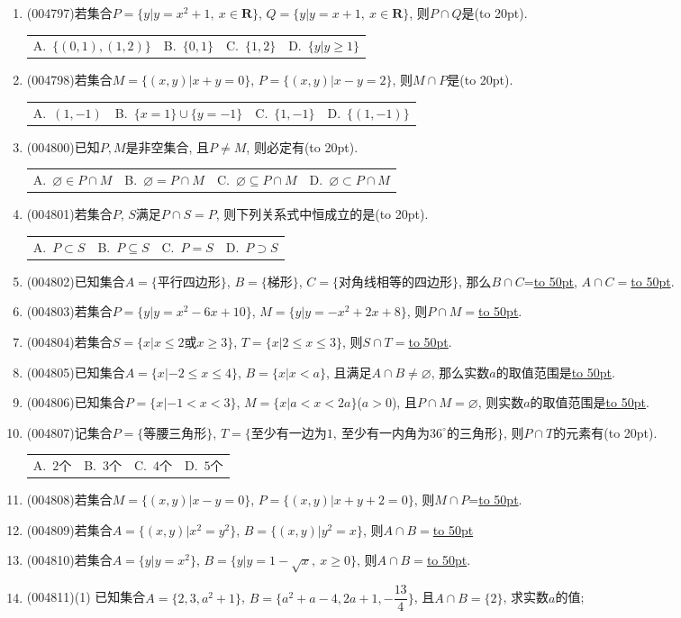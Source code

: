 \documentclass[10pt,a4paper]{article}
\newcommand{\blank}[1]{\underline{\hbox to #1pt{}}}
\newcommand{\bracket}[1]{(\hbox to #1pt{})}
\newcommand{\twoch}[4]{\par\begin{tabular}{p{.46\textwidth}p{.46\textwidth}}
A.~#1& B.~#2\\
C.~#3& D.~#4
\end{tabular}}
\newcommand{\fourch}[4]{\par\begin{tabular}{p{.23\textwidth}p{.23\textwidth}p{.23\textwidth}p{.23\textwidth}}
A.~#1 &B.~#2& C.~#3& D.~#4
\end{tabular}}
\begin{document}
\begin{enumerate}[1.]
26.已知集合$M=\{x|-3<x<2\}$, $P=\{x|x<-\sqrt 2\text{或}x>\sqrt 2\}$, 那么$M\cap P$是\bracket{20}.
\twoch{$\{x|-3<x<-\sqrt 2\text{或}\sqrt 2<x<2\}$}{$\mathbf{R}$}{$\{x|-3<x<-\sqrt 2\}$}{$\{x|\sqrt 2<x<2\}$}
\item {\tiny (004797)}若集合$P=\{y|y =x^2+1,\ x\in \mathbf{R}\}$, $Q=\{y|y=x+1, \ x\in \mathbf{R}\}$, 则$P\cap Q$是\bracket{20}.
\fourch{$\{(0,1),(1,2)\}$}{$\{0,1\}$}{$\{1,2\}$}{$\{y|y \ge 1\}$}
\item {\tiny (004798)}若集合$M=\{(x,y)|x+y=0\}$, $P=\{(x,y)|x-y=2\}$, 则$M\cap P$是\bracket{20}.
\fourch{$(1,-1)$}{$\{x=1\}\cup \{y=-1\}$}{$\{1,-1\}$}{$\{(1,-1)\}$}
\item {\tiny (004800)}已知$P,M$是非空集合, 且$P\ne M$, 则必定有\bracket{20}.
\fourch{$\varnothing \in P\cap M$}{$\varnothing=P\cap M$}{$\varnothing \subseteq P\cap M$}{$\varnothing \subset P\cap M$}
\item {\tiny (004801)}若集合$P$, $S$满足$P\cap S=P$, 则下列关系式中恒成立的是\bracket{20}.
\fourch{$P\subset S$}{$P\subseteq S$}{$P=S$}{$P\supset S$}
\item {\tiny (004802)}已知集合$A=\{\text{平行四边形}\}$, $B=\{\text{梯形}\}$, $C=\{\text{对角线相等的四边形}\}$, 那么$B\cap C$=\blank{50}, $A\cap C=$\blank{50}.
\item {\tiny (004803)}若集合$P=\{y|y=x^2-6x+10\}$, $M=\{y|y=-x^2+2x+8\}$, 则$P\cap M=$\blank{50}.
\item {\tiny (004804)}若集合$S=\{x|x\le 2\text{或}x\ge 3\}$, $T=\{x|2\le x\le 3\}$, 则$S\cap T=$\blank{50}.
\item {\tiny (004805)}已知集合$A=\{x|-2\le x\le 4\}$, $B=\{x|x<a\}$, 且满足$A\cap B\ne \varnothing$, 那么实数$a$的取值范围是\blank{50}.
\item {\tiny (004806)}已知集合$P=\{x|-1<x<3\}$, $M=\{x|a<x<2a\}$($a>0$), 且$P\cap M=\varnothing$, 则实数$a$的取值范围是\blank{50}.
\item {\tiny (004807)}记集合$P=\{\text{等腰三角形}\}$, $T=\{\text{至少有一边为}1, \ \text{至少有一内角为}36^\circ\text{的三角形}\}$, 则$P\cap T$的元素有\bracket{20}.
\fourch{$2$个}{$3$个}{$4$个}{$5$个}
\item {\tiny (004808)}若集合$M=\{(x,y)|x-y=0\}$, $P=\{(x,y)|x+y+2=0\}$, 则$M\cap P$=\blank{50}.
\item {\tiny (004809)}若集合$A=\{(x,y)|x^2=y^2\}$, $B=\{(x,y)|y^2=x\}$, 则$A\cap B=$\blank{50}
\item {\tiny (004810)}若集合$A=\{y|y =x^2\}$, $B=\{y|y=1-\sqrt x, \ x\ge 0\}$, 则$A\cap B=$\blank{50}.
\item {\tiny (004811)}(1) 已知集合$A=\{2,3,a^2+1\}$, $B=\{a^2+a-4,2a+1,-\dfrac{13}4\}$, 且$A\cap B=\{2\}$, 求实数$a$的值;\\

\end{enumerate}
\end{document}
